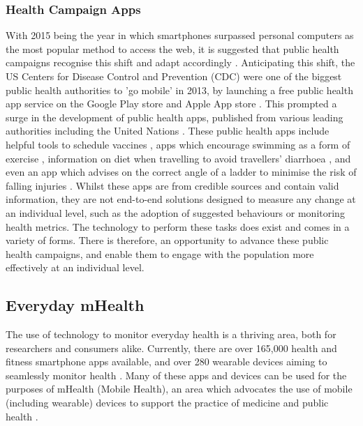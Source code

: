 \subsubsection{Health Campaign Apps}
With 2015 being the year in which smartphones surpassed personal computers as the most popular method to access the web, it is suggested that public health campaigns recognise this shift and adapt accordingly \cite{Cunningham2015}. Anticipating this shift, the US Centers for Disease Control and Prevention (CDC) were one of the biggest public health authorities to 'go mobile' in 2013, by launching a free public health app service on the Google Play store and Apple App store \cite{CentersforDiseaseControlandPrevention2013}. This prompted a surge in the development of public health apps, published from various leading authorities including the United Nations \cite{UnitedNations2015}. These public health apps include helpful tools to schedule vaccines \cite{CentersforDiseaseControlandPrevention2015b}, apps which encourage swimming as a form of exercise \cite{CentersforDiseaseControlandPrevention2015a}, information on diet when travelling to avoid travellers’ diarrhoea \cite{CentersforDiseaseControlandPrevention2015c}, and even an app which advises on the correct angle of a ladder to minimise the risk of falling injuries \cite{NationalInstituteforOccupationalSafetyandHealthDivisionofSafetyResearch2014}. Whilst these apps are from credible sources and contain valid information, they are not end-to-end solutions designed to measure any change at an individual level, such as the adoption of suggested behaviours or monitoring health metrics.
The technology to perform these tasks does exist and comes in a variety of forms. There is therefore, an opportunity to advance these public health campaigns, and enable them to engage with the population more effectively at an individual level.

\subsection{Everyday mHealth}
The use of technology to monitor everyday health is a thriving area, both for researchers and consumers alike. Currently, there are over 165,000 health and fitness smartphone apps available, and over 280 wearable devices aiming to seamlessly monitor health \cite{IMSmHealth2015}. Many of these apps and devices can be used for the purposes of mHealth (Mobile Health), an area which advocates the use of mobile (including wearable) devices to support the practice of medicine and public health \cite{Adibi2015}.

